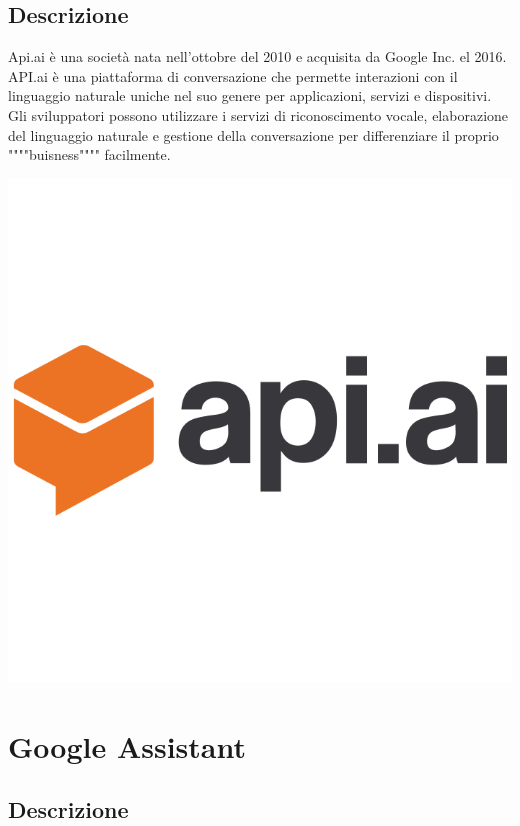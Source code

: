 \documentclass[a4paper,titlepage]{article}
\begin{document}
	\subsection{Descrizione}
	\begin{minipage}{0.7\textwidth}\raggedright
		Api.ai è una società nata nell'ottobre del 2010 e acquisita da Google Inc. el 2016.
		API.ai è una piattaforma di conversazione che permette interazioni con il linguaggio naturale uniche nel suo genere per applicazioni, servizi e dispositivi. Gli sviluppatori possono utilizzare i servizi di riconoscimento vocale, elaborazione del linguaggio naturale e gestione della conversazione per differenziare il proprio """"buisness"""" facilmente.
	\end{minipage}
	\hfill
	\noindent\begin{minipage}{0.1\textwidth}
		\includegraphics[scale=0.15]{images/apiai.png}
	\end{minipage}


\section{Google Assistant}
\subsection{Descrizione}
\end{document}
